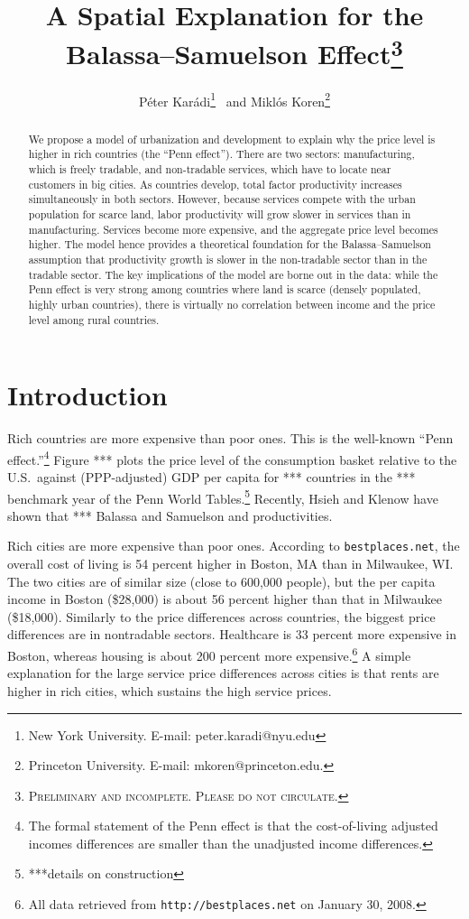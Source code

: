 \documentclass[12pt]{article}
\begin{document}
\title{A Spatial Explanation for the Balassa--Samuelson Effect\thanks{\textsc{Preliminary and incomplete. Please do not circulate.}}}
\author{P\'eter Kar\'adi\thanks{New York University. E-mail: peter.karadi@nyu.edu}~ and Mikl\'os Koren\thanks{Princeton University. E-mail: mkoren@princeton.edu.}}
\maketitle

\begin{abstract}
We propose a model of urbanization and development to explain why the price level is higher in rich countries (the ``Penn effect''). There are two sectors: manufacturing, which is freely tradable, and non-tradable services, which have to locate near customers in big cities. As countries develop, total factor productivity increases simultaneously in both sectors. However, because services compete with the urban population for scarce land, labor productivity will grow slower in services than in manufacturing. Services become more expensive, and the aggregate price level becomes higher. The model hence provides a theoretical foundation for the Balassa--Samuelson assumption that productivity growth is slower in the non-tradable sector than in the tradable sector. The key implications of the model are borne out in the data: while the Penn effect is very strong among countries where land is scarce (densely populated, highly urban countries), there is virtually no correlation between income and the price level among rural countries.
\end{abstract}

\section{Introduction}
Rich countries are more expensive than poor ones. This is the well-known ``Penn effect.''\footnote{The formal statement of the Penn effect is that the cost-of-living adjusted incomes differences are smaller than the unadjusted income differences.} Figure *** plots the price level of the consumption basket relative to the U.S.~against (PPP-adjusted) GDP per capita for *** countries in the *** benchmark year of the Penn World Tables.\footnote{***details on construction} Recently, Hsieh and Klenow have shown that *** Balassa and Samuelson and productivities. 

Rich cities are more expensive than poor ones. According to \texttt{bestplaces.net}, the overall cost of living is 54 percent higher in Boston, MA than in Milwaukee, WI. The two cities are of similar size (close to 600,000 people), but the per capita income in Boston (\$28,000) is about 56 percent higher than that in Milwaukee (\$18,000). Similarly to the price differences across countries, the biggest price differences are in nontradable sectors. Healthcare is 33 percent more expensive in Boston, whereas housing is about 200 percent more expensive.\footnote{All data retrieved from \texttt{http://bestplaces.net} on January 30, 2008.} A simple explanation for the large service price differences across cities is that rents are higher in rich cities, which sustains the high service prices.
\end{document}

